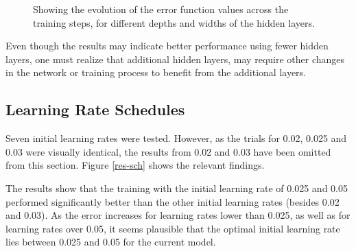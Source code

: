 \documentclass[]{article}
\begin{document}
\begin{figure}[h]
	\centering
	
	\caption{Showing the evolution of the error function values across the training steps, for different depths and widths of the hidden layers.}
	\label{res-hidden}
\end{figure}

Even though the results may indicate better performance using fewer hidden layers, one must realize that additional hidden layers, may require other changes in the network or training process to benefit from the additional layers. 

\subsection{Learning Rate Schedules}

Seven initial learning rates were tested. However, as the trials for 0.02, 0.025 and 0.03 were visually identical, the results from 0.02 and 0.03 have been omitted from this section. Figure \ref{res-sch} shows the relevant findings.

The results show that the training with the initial learning rate of 0.025 and 0.05 performed significantly better than the other initial learning rates (besides 0.02 and 0.03). As the error increases for learning rates lower than 0.025, as well as for learning rates over 0.05, it seems plausible that the optimal initial learning rate lies between 0.025 and 0.05 for the current model. 
\end{document}
